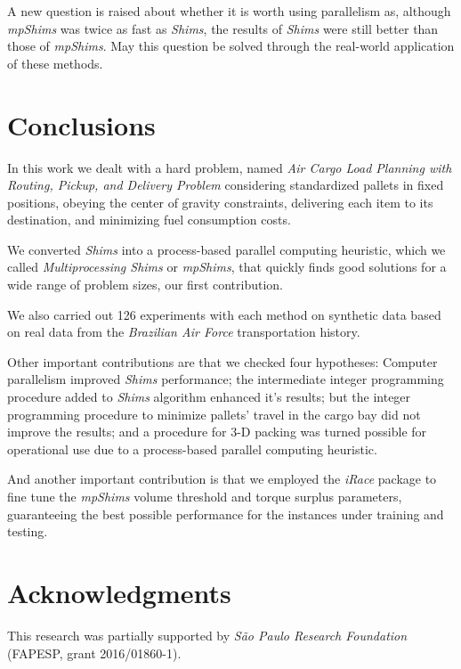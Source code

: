 \documentclass[preprint,authoryear]{elsarticle}
\begin{document}
A new question is raised about whether it is worth using parallelism as, although {\it mpShims} was twice as fast as {\it Shims}, the results of {\it Shims} were still better than those of {\it mpShims}. May this question be solved through the real-world application of these methods.


\section{Conclusions}
\label{sec7}

In this work we dealt with a hard problem, named {\it Air Cargo Load Planning with Routing, Pickup, and Delivery Problem} considering standardized pallets in fixed positions, obeying the center of gravity constraints, delivering each item to its destination, and minimizing fuel consumption costs.

We converted {\it Shims} into a process-based parallel computing heuristic, which we called {\it Multiprocessing Shims} or {\it mpShims}, that quickly finds good solutions for a wide range of problem sizes, our first contribution.

We also carried out 126 experiments with each method on synthetic data based on real data from the {\it Brazilian Air Force} transportation history.

Other important contributions are that we checked four hypotheses: Computer parallelism improved {\it Shims} performance; the intermediate integer programming procedure added to {\it Shims} algorithm enhanced it's results; but the integer programming procedure to minimize pallets' travel in the cargo bay did not improve the results; and a procedure for 3-D packing was turned possible for operational use due to a process-based parallel computing heuristic.

And another important contribution is that we employed the {\it iRace} package to fine tune the {\it mpShims} volume threshold and torque surplus parameters, guaranteeing the best possible performance for the instances under training and testing.

\section*{Acknowledgments}

This research was partially supported by \textit{São Paulo Research Foundation} (FAPESP, grant 2016/01860-1).




\end{document}
